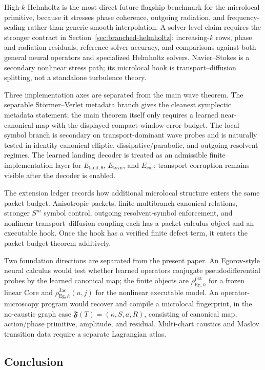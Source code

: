 High-$k$ Helmholtz is the most direct future flagship benchmark for the microlocal primitive, because it stresses phase coherence, outgoing radiation, and frequency-scaling rather than generic smooth interpolation.  A solver-level claim requires the stronger contract in Section~\ref{sec:branched-helmholtz}: increasing-$k$ rows, phase and radiation residuals, reference-solver accuracy, and comparisons against both general neural operators and specialized Helmholtz solvers.  Navier--Stokes is a secondary nonlinear stress path; its microlocal hook is transport--diffusion splitting, not a standalone turbulence theory.

Three implementation axes are separated from the main wave theorem.  The separable St\"ormer--Verlet metadata branch gives the cleanest symplectic metadata statement; the main theorem itself only requires a learned near-canonical map with the displayed compact-window error budget.  The local symbol branch is secondary on transport-dominant wave probes and is naturally tested in identity-canonical elliptic, dissipative/parabolic, and outgoing-resolvent regimes.  The learned landing decoder is treated as an admissible finite implementation layer for $E_{\mathrm{land},\theta}$, $E_{\mathrm{tsyn}}$, and $E_{\mathrm{car}}$; transport corruption remains visible after the decoder is enabled.

The extension ledger records how additional microlocal structure enters the same packet budget.  Anisotropic packets, finite multibranch canonical relations, stronger $S^m$ symbol control, outgoing resolvent-symbol enforcement, and nonlinear transport--diffusion coupling each has a packet-calculus object and an executable hook.  Once the hook has a verified finite defect term, it enters the packet-budget theorem additively.

Two foundation directions are separated from the present paper.  An Egorov-style neural calculus would test whether learned operators conjugate pseudodifferential probes by the learned canonical map; the finite objects are $\rho_{\mathrm{Eg},h}^{\mathrm{pkt}}$ for a frozen linear Core and $\rho_{\mathrm{Eg},h}^{\mathrm{Jac}}(u,j)$ for the nonlinear executable model.  An operator-microscopy program would recover and compile a microlocal fingerprint, in the no-caustic graph case $\mathfrak F(T)=(\kappa,S,a,R)$, consisting of canonical map, action/phase primitive, amplitude, and residual.  Multi-chart caustics and Maslov transition data require a separate Lagrangian atlas.

\subsection{Conclusion}

